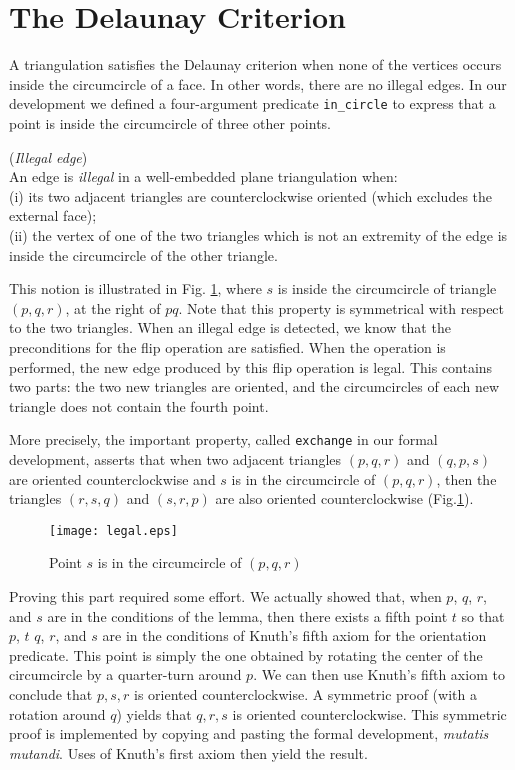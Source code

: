\documentclass{llncs}
\begin{document}
\section{The Delaunay Criterion}
\label{DP}
A triangulation satisfies the Delaunay criterion when none of the
vertices occurs inside the circumcircle of a face.  In other words, there
are no illegal edges.  In our development we defined a four-argument predicate
 {\tt in\_circle} to express that a point is inside the circumcircle of
three other points.

\begin{definition}({\em Illegal edge}) 
\label{Il}\\
An edge is {\em illegal} in a well-embedded plane triangulation when:\\
(i) its two adjacent triangles are counterclockwise oriented 
(which excludes the external face); \\
(ii) the vertex of one of the two triangles which is not an extremity of the
edge is inside the circumcircle of the other triangle.
\end{definition}

This notion is illustrated in Fig. \ref{fig:legal}, where \(s\)
is inside the circumcircle of triangle \((p, q, r)\), at the right
of \(pq\).  Note that this property is symmetrical with respect to
the two triangles.  When an illegal edge is detected, we know that the
preconditions for the flip operation are satisfied.  When the operation is performed, the new edge produced by this flip operation is
legal.  This contains two parts: the two new triangles are oriented, and
the circumcircles of each new triangle does not contain the fourth point.

More precisely, the important property, called {\tt exchange} in our
formal development, asserts that when two adjacent triangles $(p,q,r)$
and $(q,p,s)$ are oriented counterclockwise and $s$ is in the
circumcircle of $(p,q,r)$, then the triangles $(r,s,q)$ and $(s,r,p)$
are also oriented counterclockwise (Fig.\ref{fig:legal}).

\begin{figure}
\begin{center}
\texttt{[image: legal.eps]}
\end{center}
\caption{Point $s$ is in the circumcircle of $(p,q,r)$}
\label{fig:legal}
\end{figure}

Proving this part required some effort.  We actually showed that, when
\(p\), \(q\), \(r\), and \(s\) are in the conditions of the lemma,
then there exists a fifth point \(t\) so that \(p\), \(t\) \(q\), \(r\),
and \(s\) are in the conditions of Knuth's fifth axiom for the 
orientation predicate.  This point is simply the one obtained by rotating
the center of the circumcircle by a quarter-turn around \(p\).  We can then
use Knuth's fifth axiom to conclude that \(p,s,r\) is oriented counterclockwise.
A symmetric proof (with a rotation around \(q\)) yields that \(q,r,s\) is
oriented counterclockwise.  This symmetric proof is implemented by
copying and pasting the formal development, {\sl mutatis mutandi}.  Uses
of Knuth's first axiom then yield the result.
\end{document}
